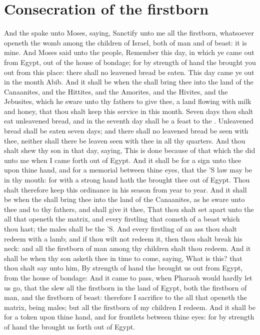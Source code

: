\section*{Consecration of the firstborn}
\begin{biblechapter} %
\verse And the \LORD spake unto Moses, saying,
\verse Sanctify unto me all the firstborn, whatsoever openeth the womb among the children of Israel, both of man and of beast: it is mine.
\verse And Moses said unto the people, Remember this day, in which ye came out from Egypt, out of the house of bondage; for by strength of hand the \LORD brought you out from this place: there shall no leavened bread be eaten.
\verse This day came ye out in the month Abib.
\verse And it shall be when the \LORD shall bring thee into the land of the Canaanites, and the Hittites, and the Amorites, and the Hivites, and the Jebusites, which he sware unto thy fathers to give thee, a land flowing with milk and honey, that thou shalt keep this service in this month.
\verse Seven days thou shalt eat unleavened bread, and in the seventh day shall be a feast to the \LORD.
\verse Unleavened bread shall be eaten seven days; and there shall no leavened bread be seen with thee, neither shall there be leaven seen with thee in all thy quarters.
\verse And thou shalt shew thy son in that day, saying, This is done because of that which the \LORD did unto me when I came forth out of Egypt.
\verse And it shall be for a sign unto thee upon thine hand, and for a memorial between thine eyes, that the \LORD'S law may be in thy mouth: for with a strong hand hath the \LORD brought thee out of Egypt.
\verse Thou shalt therefore keep this ordinance in his season from year to year.
\verse And it shall be when the \LORD shall bring thee into the land of the Canaanites, as he sware unto thee and to thy fathers, and shall give it thee,
\verse That thou shalt set apart unto the \LORD all that openeth the matrix, and every firstling that cometh of a beast which thou hast; the males shall be the \LORD'S.
\verse And every firstling of an ass thou shalt redeem with a lamb; and if thou wilt not redeem it, then thou shalt break his neck: and all the firstborn of man among thy children shalt thou redeem.
\verse And it shall be when thy son asketh thee in time to come, saying, What is this? that thou shalt say unto him, By strength of hand the \LORD brought us out from Egypt, from the house of bondage:
\verse And it came to pass, when Pharaoh would hardly let us go, that the \LORD slew all the firstborn in the land of Egypt, both the firstborn of man, and the firstborn of beast: therefore I sacrifice to the \LORD all that openeth the matrix, being males; but all the firstborn of my children I redeem.
\verse And it shall be for a token upon thine hand, and for frontlets between thine eyes: for by strength of hand the \LORD brought us forth out of Egypt.

\end{biblechapter}
